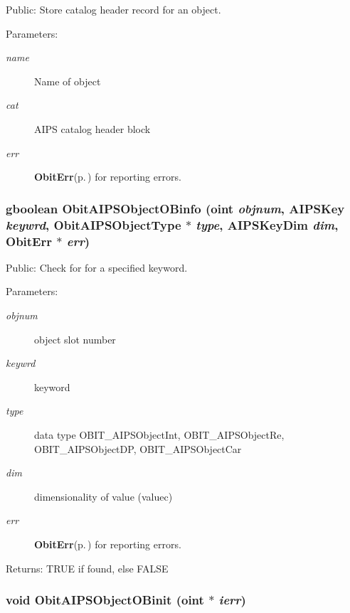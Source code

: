 Public: Store catalog header record for an object. 

\begin{Desc}
\item[Parameters:]
\begin{description}
\item[{\em name}]Name of object \item[{\em cat}]AIPS catalog header block \item[{\em err}]{\bf Obit\-Err}{\rm (p.\,\pageref{structObitErr})} for reporting errors. \end{description}
\end{Desc}
\subsubsection{\setlength{\rightskip}{0pt plus 5cm}gboolean Obit\-AIPSObject\-OBinfo ({\bf oint} {\em objnum}, {\bf AIPSKey} {\em keywrd}, Obit\-AIPSObject\-Type $\ast$ {\em type}, {\bf AIPSKey\-Dim} {\em dim}, {\bf Obit\-Err} $\ast$ {\em err})}\label{ObitAIPSObject_8c_a25}


Public: Check for for a specified keyword. 

\begin{Desc}
\item[Parameters:]
\begin{description}
\item[{\em objnum}]object slot number \item[{\em keywrd}]keyword \item[{\em type}]data type OBIT\_\-AIPSObject\-Int, OBIT\_\-AIPSObject\-Re, OBIT\_\-AIPSObject\-DP, OBIT\_\-AIPSObject\-Car \item[{\em dim}]dimensionality of value (valuec) \item[{\em err}]{\bf Obit\-Err}{\rm (p.\,\pageref{structObitErr})} for reporting errors. \end{description}
\end{Desc}
\begin{Desc}
\item[Returns:]TRUE if found, else FALSE \end{Desc}
\subsubsection{\setlength{\rightskip}{0pt plus 5cm}void Obit\-AIPSObject\-OBinit ({\bf oint} $\ast$ {\em ierr})}\label{ObitAIPSObject_8c_a22}


